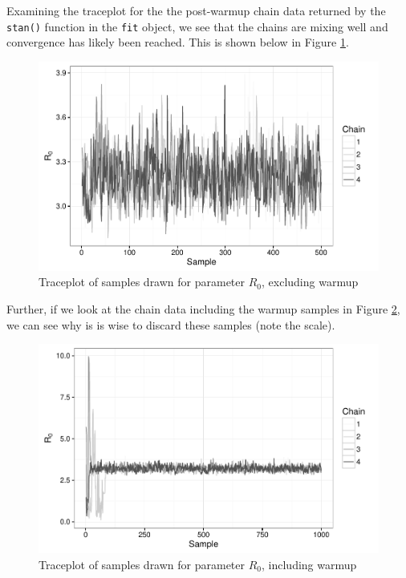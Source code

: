     Examining the traceplot for the the post-warmup chain data returned by the \verb|stan()| function in the \verb|fit| object, we see that the chains are mixing well and convergence has likely been reached. This is shown below in Figure \ref{traceplot}.

    \begin{figure}[H]
        \centering
        \includegraphics[width=\textwidth]{./images/traceplotR0.pdf}
        \caption{Traceplot of samples drawn for parameter $R_0$, excluding warmup}
        \label{traceplot}
    \end{figure}

    Further, if we look at the chain data including the warmup samples in Figure \ref{traceplot2}, we can see why is is wise to discard these samples (note the scale).

    \begin{figure}[H]
        \centering
        \includegraphics[width=\textwidth]{./images/traceplotR0_inc.pdf}
        \caption{Traceplot of samples drawn for parameter $R_0$, including warmup}
        \label{traceplot2}
    \end{figure}

